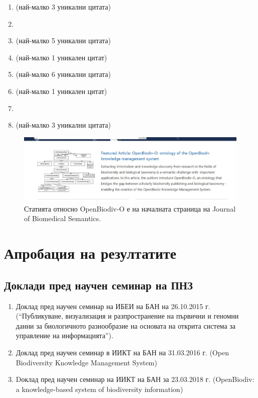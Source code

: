 \begingroup
{}
\setcounter{count}{99}
%

\begin{enumerate}
\item {} (най-малко 3 уникални цитата)
\item {}
\item {} (най-малко 5 уникални цитата)
\item {} (най-малко 1 уникален цитат)
\item {} (най-малко 6 уникални цитата)
\item {} (най-малко 1 уникален цитат)
\item {} 
\item {} (най-малко 3 уникални цитата)
\end{enumerate}
\endgroup

\begin{figure}
\centering
\includegraphics[width=\textwidth]{Figures/JBS-featured.jpg}
\decoRule
\caption{Статията относно OpenBiodiv-O е на началната страница на Journal of Biomedical Semantics.}
\label{fig:jbs-featured}
\end{figure}

\section*{Апробация на резултатите}

\subsection*{Доклади пред научен семинар на ПНЗ}

\begin{enumerate}
    \item Доклад пред научен семинар на ИБЕИ на БАН на 26.10.2015 г. (“Публикуване, визуализация и разпространение на първични и геномни данни за биологичното разнообразие на основата на открита система за управление на информацията”).
    \item Доклад пред научен семинар в ИИКТ на БАН на 31.03.2016 г. (Open Biodiversity Knowledge Management System)
    \item Dоклад пред научен семинар на ИИКТ на БАН за 23.03.2018 г. (OpenBiodiv: a knowledge-based system of biodiversity information)
\end{enumerate}


